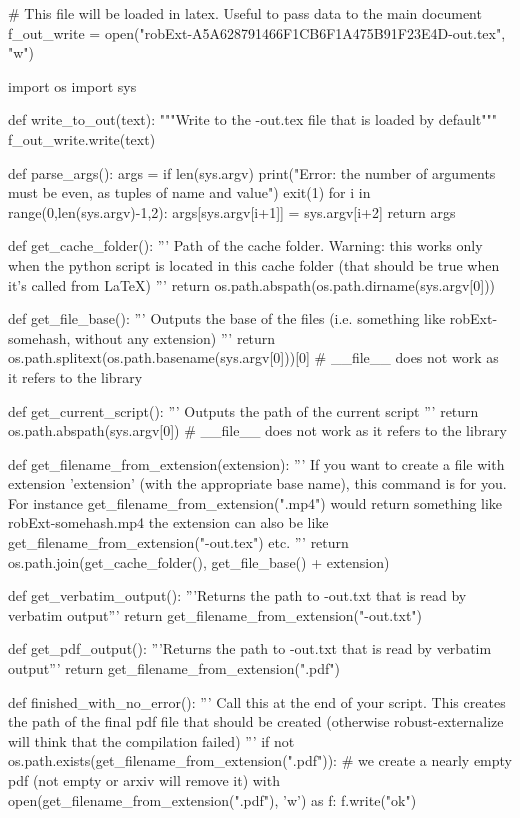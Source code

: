 
# This file will be loaded in latex. Useful to pass data to the main document
f_out_write = open("robExt-A5A628791466F1CB6F1A475B91F23E4D-out.tex", "w")

import os
import sys

def write_to_out(text):
    """Write to the -out.tex file that is loaded by default"""
    f_out_write.write(text)

def parse_args():
    args = {}
    if len(sys.argv) %
        print("Error: the number of arguments must be even, as tuples of name and value")
        exit(1)
    for i in range(0,len(sys.argv)-1,2):
        args[sys.argv[i+1]] = sys.argv[i+2]
    return args

def get_cache_folder():
    '''
    Path of the cache folder. Warning: this works only when the python script
    is located in this cache folder (that should be true when it's called from LaTeX)
    '''
    return os.path.abspath(os.path.dirname(sys.argv[0]))

def get_file_base():
    '''
    Outputs the base of the files (i.e. something like robExt-somehash, without any extension)
    '''
    return os.path.splitext(os.path.basename(sys.argv[0]))[0] # __file__ does not work as it refers to the library

def get_current_script():
    '''
    Outputs the path of the current script
    '''
    return os.path.abspath(sys.argv[0]) # __file__ does not work as it refers to the library


def get_filename_from_extension(extension):
    '''
    If you want to create a file with extension 'extension' (with the appropriate base name), this command
    is for you. For instance get_filename_from_extension(".mp4") would return something like
    robExt-somehash.mp4
    the extension can also be like get_filename_from_extension("-out.tex") etc.
    '''
    return os.path.join(get_cache_folder(), get_file_base() + extension)

def get_verbatim_output():
    '''Returns the path to -out.txt that is read by verbatim output'''
    return get_filename_from_extension("-out.txt")

def get_pdf_output():
    '''Returns the path to -out.txt that is read by verbatim output'''
    return get_filename_from_extension(".pdf")


def finished_with_no_error():
    '''
    Call this at the end of your script. This creates the path of the final pdf file that should be
    created (otherwise robust-externalize will think that the compilation failed)
    '''
    if not os.path.exists(get_filename_from_extension(".pdf")):
        # we create a nearly empty pdf (not empty or arxiv will remove it)
        with open(get_filename_from_extension(".pdf"), 'w') as f:
            f.write("ok")

